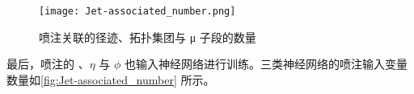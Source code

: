 \begin{figure}[ht]
      \centering
      \texttt{[image: Jet-associated\_number.png]}
      \caption{喷注关联的径迹、拓扑集团与 μ 子段的数量}
      \label{fig:Jet-associated_number}
\end{figure}

最后，喷注的 \pt、$\eta$ 与 $\phi$ 也输入神经网络进行训练。三类神经网络的喷注输入变量数量如\autoref{fig:Jet-associated_number} 所示。
